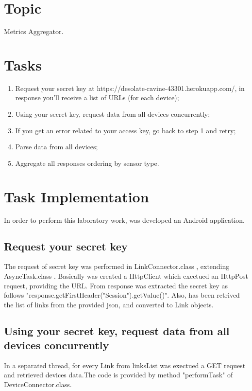 \documentclass[12pt]{article}
\begin{document}

\newpage
{}
\setcounter{page}{2}
	\tableofcontents
	\newpage
	
	\section{Topic}
	Metrics Aggregator.
	\section{Tasks}
	\begin{enumerate}
		\item Request your secret key at https://desolate-ravine-43301.herokuapp.com/, in response you'll receive a list of URLs (for each device);
		\item Using your secret key, request data from all devices concurrently;
		\item If you get an error related to your access key, go back to step 1 and retry;
		\item Parse data from all devices;
		\item Aggregate all responses ordering by sensor type.
	\end{enumerate}
	

	\newpage
	\section{Task Implementation}
	
	In order to perform this laboratory work, was developed an Android application.
	
	\subsection{Request your secret key}
	The request of secret key was performed in LinkConnector.class , extending AsyncTask.class . Basically was created a HttpClient which exectued an HttpPost request, providing the URL. From response was extracted the secret key as follows "response.getFirstHeader("Session").getValue()".
	Also, has been retrived the list of links from the provided json, and converted to Link objects.
	
	
	
	
	
	\subsection{Using your secret key, request data from all devices concurrently}
	In a separated thread, for every Link from linksList was exectued a GET request and retrieved devices data.The code is provided by method "performTask" of DeviceConnector.class.
	
\end{document}

